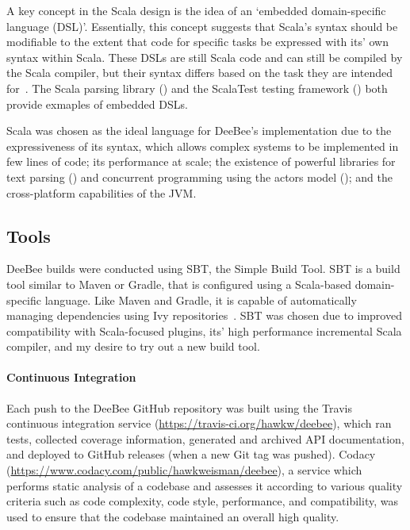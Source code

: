 A key concept in the Scala design is the idea of an `embedded domain-specific language (DSL)'. Essentially, this concept suggests that Scala's syntax should be modifiable to the extent that code for specific tasks be expressed with its' own syntax within Scala. These DSLs are still Scala code and can still be compiled by the Scala compiler, but their syntax differs based on the task they are intended for~\cite{ghosh2010dsls,hofer2008polymorphic,odersky2008programming}. The Scala parsing library () and the ScalaTest testing framework () both provide exmaples of embedded DSLs.

Scala was chosen as the ideal language for DeeBee's implementation due to the expressiveness of its syntax, which allows complex systems to be implemented in few lines of code; its performance at scale; the existence of powerful libraries for text parsing () and concurrent programming using the actors model (); and the cross-platform capabilities of the JVM.

\subsection{Tools}

DeeBee builds were conducted using SBT, the Simple Build Tool. SBT is a build tool similar to Maven or Gradle, that is configured using a Scala-based domain-specific language. Like Maven and Gradle, it is capable of automatically managing dependencies using Ivy repositories~\cite{saxena2013getting}. SBT was chosen due to improved compatibility with Scala-focused plugins, its' high performance incremental Scala compiler, and my desire to try out a new build tool. 

\paragraph{Continuous Integration}
Each push to the DeeBee GitHub repository was built using the Travis continuous integration service (\url{https://travis-ci.org/hawkw/deebee}), which ran tests, collected coverage information, generated and archived API documentation, and deployed to GitHub releases  (when a new Git tag was pushed). Codacy (\url{https://www.codacy.com/public/hawkweisman/deebee}), a service which performs static analysis of a codebase and assesses it according to various quality criteria such as code complexity, code style, performance, and compatibility, was used to ensure that the codebase maintained an overall high quality.



